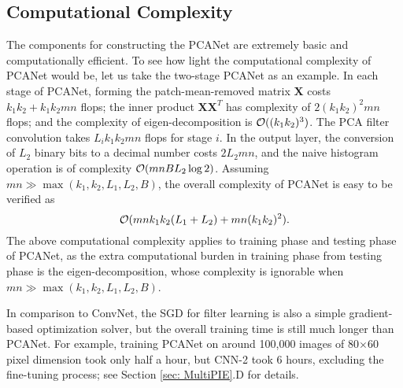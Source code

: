 \documentclass[10pt,journal,compsoc]{IEEEtran}
\begin{document}
{
\subsection{Computational Complexity}
The components for constructing the PCANet are extremely basic and computationally efficient. To see how light the computational complexity of PCANet would be, let us take the two-stage PCANet as an example. In each stage of PCANet, forming the patch-mean-removed matrix $\bm{X}$ costs $k_1k_2 + k_1k_2mn$ flops; the inner product $\bm{X}\bm{X}^T$ has complexity of $2(k_1k_2)^2mn$ flops; and the complexity of eigen-decomposition is ${\cal O}((k_1k_2)^3)$. The PCA filter convolution takes $L_i k_1k_2mn$ flops for stage $i$. In the output layer, the conversion of $L_2$ binary bits to a decimal number costs $2L_2 mn$, and the naive histogram operation is of complexity ${\cal O}(mn B L_2\log 2)$. Assuming $mn \gg \max(k_1,k_2,L_1,L_2, B)$, the overall complexity of PCANet is easy to be verified as $${\cal O}(mn k_1k_2(L_1 + L_2) + mn(k_1k_2)^2).$$
The above computational complexity applies to training phase and testing phase of PCANet, as the extra computational burden in training phase from testing phase is the eigen-decomposition, whose complexity is ignorable when $mn \gg \max(k_1,k_2,L_1,L_2, B)$.

In comparison to ConvNet, the SGD for filter learning is also a simple gradient-based optimization solver, but the overall training time is still much longer than PCANet. For example, training PCANet on around 100,000 images of 80$\times$60 pixel dimension took only half a hour, but CNN-2 took 6 hours, excluding the fine-tuning process; see Section \ref{sec: MultiPIE}.D for details.
}
\end{document}
